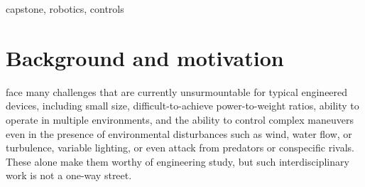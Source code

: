 \documentclass[onecolumn,10pt]{IEEEtran}
\begin{document}
\begin{abstract}
\end{abstract}

\begin{IEEEkeywords}
capstone, robotics, controls
\end{IEEEkeywords}

\section{Background and motivation}
 face many challenges that are currently unsurmountable for typical engineered devices, including small size, difficult-to-achieve power-to-weight ratios, ability to operate in multiple environments, and the ability to control complex maneuvers even in the presence of environmental disturbances such as wind, water flow, or turbulence, variable lighting, or even attack from predators or conspecific rivals. These alone make them worthy of engineering study, but such interdisciplinary work is not a one-way street. 
\end{document}
